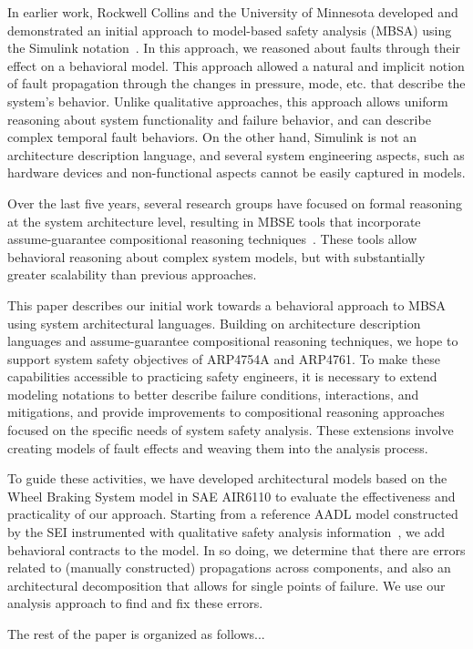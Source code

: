 In earlier work, Rockwell Collins and the University of Minnesota developed and demonstrated an initial approach to model-based safety analysis (MBSA) using the Simulink notation~.  In this approach, we reasoned about faults through their effect on a behavioral model.  This approach allowed a natural and implicit notion of fault propagation through the changes in pressure, mode, etc. that describe the system's behavior.  Unlike qualitative approaches, this approach allows uniform reasoning about system functionality and failure behavior, and can describe complex temporal fault behaviors.  On the other hand, Simulink is not an architecture description language, and several system engineering aspects, such as hardware devices and non-functional aspects cannot be easily captured in models.

Over the last five years, several research groups have focused on formal reasoning at the system architecture level, resulting in MBSE tools that incorporate assume-guarantee compositional reasoning techniques~\cite{Trento and Rockwell and UMN}.  These tools allow behavioral reasoning about complex system models, but with substantially greater scalability than previous approaches.

This paper describes our initial work towards a behavioral approach to MBSA using system architectural languages.  Building on architecture description languages and assume-guarantee compositional reasoning techniques, we hope to support system safety objectives of ARP4754A and ARP4761.  To make these capabilities accessible to practicing safety engineers, it is necessary to extend modeling notations to better describe failure conditions, interactions, and mitigations, and provide improvements to compositional reasoning approaches focused on the specific needs of system safety analysis.  These extensions involve creating models of fault effects and weaving them into the analysis process.  

To guide these activities, we have developed architectural models based on the Wheel Braking System model in SAE AIR6110 to evaluate the effectiveness and practicality of our approach.  Starting from a reference AADL model constructed by the SEI instrumented with qualitative safety analysis information~\cite{}, we add behavioral contracts to the model.  In so doing, we determine that there are errors related to (manually constructed) propagations across components, and also an architectural decomposition that allows for single points of failure.  We use our analysis approach to find and fix these errors.

The rest of the paper is organized as follows...



